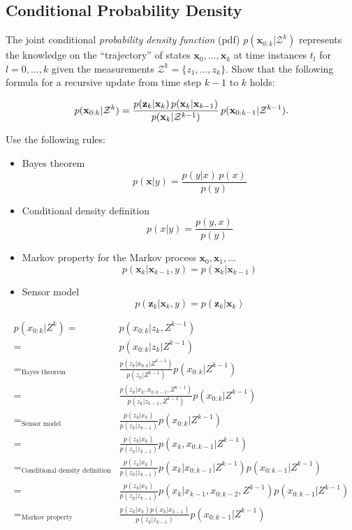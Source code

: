 \documentclass{article}
\begin{document}
  \subsection{Conditional Probability Density}
  \begin{centerframebox}
    The joint conditional \textit{probability density function} (pdf)  $p(\mathbf{x}_{0:k}|\mathcal{Z}^{k})$
    represents the knowledge on the ``trajectory'' of states $\mathbf{x}_0, \dots, \mathbf{x}_k$ at time instances $t_l$
    for $l = 0, \dots , k$ given the measurements $\mathcal{Z}^k = \{z_1, \dots, z_k\}$.
    Show that the following formula for a recursive update from time step $k - 1$ to $k$ holds:

    \[ p(\mathbf{x}_{0:k}|{\mathcal{Z}}^{k})=\frac{p({\bf z}_{k}|\mathbf{x}_{k})\,p(\mathbf{x}_{k}|\mathbf{x}_{k-1})}{p(\mathbf{x}_{k}|{\mathcal{Z}}^{k-1})}\,p(\mathbf{x}_{0:k-1}|{\mathcal{Z}}^{k-1}). \]

    Use the following rules:
    \begin{itemize}
      \item Bayes theorem
      \[ p(\mathbf{x}|y)={\frac{p(y|x)\,p(x)}{p(y)}} \]
      \item Conditional density definition
      \[ p(x|y)={\frac{p(y,x)}{p(y)}} \]
      \item Markov property for the Markov process $\mathbf{x}_0, \mathbf{x}_1, \dots$
      \[ p(\mathbf{x}_{k}|\mathbf{x}_{k-1},y)=p(\mathbf{x}_{k}|\mathbf{x}_{k-1}) \]
      \item Sensor model
      \[ p(\mathbf{z}_{k}|\mathbf{x}_{k},y)=p(\mathbf{z}_{k}|\mathbf{x}_{k}) \]
    \end{itemize}
  \end{centerframebox}

  \begin{align*}
      p(x_{0:k}|Z^k) =& p(x_{0:k}|z_k, Z^{k-1})\\
      =& p(x_{0:k}|z_k| Z^{k-1})\\
      =_\text{Bayes theorem}& \frac{p(z_k|x_{0:k}|Z^{k-1})}{p(z_k|Z^{k-1})}p(x_{0:k}|Z^{k-1})\\
      =& \frac{p(z_k|x_k, x_{0:k-1}, Z^{k-1})}{p(z_k|z_{k-1}, Z^{k-2})}p(x_{0:k}|Z^{k-1})\\
      =_\text{Sensor model}& \frac{p(z_k|x_k)}{p(z_k|z_{k-1})}p(x_{0:k}|Z^{k-1})\\
      =& \frac{p(z_k|x_k)}{p(z_k|z_{k-1})}p(x_k, x_{0:k-1}|Z^{k-1})\\
      =_\text{Conditional density definition}& \frac{p(z_k|x_k)}{p(z_k|z_{k-1})}p(x_k|x_{0:k-1}|Z^{k-1})p(x_{0:k-1}|Z^{k-1})\\
      =& \frac{p(z_k|x_k)}{p(z_k|z_{k-1})}p(x_k|x_{k-1}, x_{0:k-2}, Z^{k-1})p(x_{0:k-1}|Z^{k-1})\\
      =_\text{Markov property}& \frac{p(z_k|x_k)p(x_k|x_{k-1})}{p(z_k|z_{k-1})}p(x_{0:k-1}|Z^{k-1})\\
  \end{align*}
\end{document}
